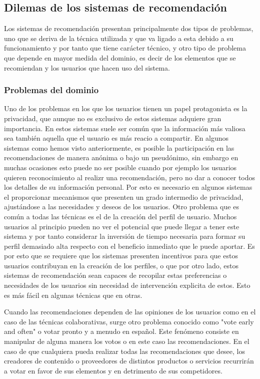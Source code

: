 \subsection{Dilemas de los sistemas de recomendación}
Los sistemas de recomendación presentan principalmente dos tipos de problemas, uno que se deriva de la técnica utilizada y que va ligado a esta debido a su funcionamiento y por tanto que tiene carácter técnico, y otro tipo de problema que depende en mayor medida del dominio, es decir de los elementos que se recomiendan y los usuarios que hacen uso del sistema.

\subsubsection{Problemas del dominio}
Uno de los problemas en los que los usuarios tienen un papel protagonista es la privacidad, que aunque no es exclusivo de estos sistemas adquiere gran importancia. En estos sistemas suele ser común que la información más valiosa sea también aquella que el usuario es más reacio a compartir. En algunos sistemas como hemos visto anteriormente, es posible la participación en las recomendaciones de manera anónima o bajo un pseudónimo, sin embargo en muchas ocasiones esto puede no ser posible cuando por ejemplo los usuarios quieren reconocimiento al realizr una recomendación, pero no dar a conocer todos los detalles de su información personal. Por esto es necesario en algunos sistemas el proporcionar mecanismos que presenten un grado intermedio de privacidad, ajustándose a las necesidades y deseos de los usuarios. Otro problema que es común a todas las técnicas es el de la creación del perfil de usuario. Muchos usuarios al principio pueden no ver el potencial que puede llegar a tener este sistema y por tanto considerar la inversión de tiempo necesaria para formar su perfil demasiado alta respecto con el beneficio inmediato que le puede aportar. Es por esto que se requiere que los sistemas presenten incentivos para que estos usuarios contribuyan en la creación de los perfiles, o que por otro lado, estos sistemas de recomendación sean capaces de recopilar estas preferencias o necesidades de los usuarios sin necesidad de intervención explicita de estos. Esto es más fácil en algunas técnicas que en otras.

Cuando las recomendaciones dependen de las opiniones de los usuarios como en el caso de las técnicas colaborativas, surge otro problema conocido como "vote early and often" o votar pronto y a menudo en español. Este fenómeno consiste en manipular de alguna manera los votos o en este caso las recomendaciones. En el caso de que cualquiera pueda realizar todas las recomendaciones que desee, los creadores de contenido o proveedores de distintos productos o servicios recurrirán a votar en favor de sus elementos y en detrimento de sus competidores.


